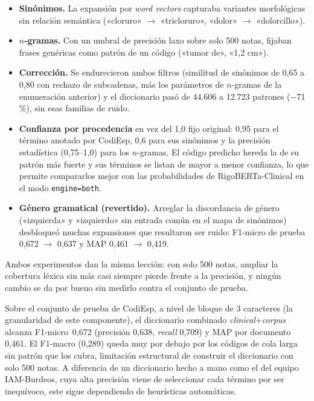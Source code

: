 \begin{itemize}
 \item \textbf{Sinónimos.} La expansión por \emph{word vectors} capturaba variantes morfológicas sin relación semántica («cloruro» $\to$ «tricloruro», «dolor» $\to$ «dolorcillo»).
 \item \textbf{$n$-gramas.} Con un umbral de precisión laxo sobre solo 500 notas, fijaban frases genéricas como patrón de un código («tumor de», «1,2 cm»).
 \item \textbf{Corrección.} Se endurecieron ambos filtros (similitud de sinónimos de 0,65 a 0,80 con rechazo de subcadenas, más los parámetros de $n$-gramas de la enumeración anterior) y el diccionario pasó de 44.606 a 12.723 patrones ($-$71\,\%), sin esas familias de ruido.
 \item \textbf{Confianza por procedencia} en vez del 1,0 fijo original: 0,95 para el término anotado por CodiEsp, 0,6 para sus sinónimos y la precisión estadística (0,75--1,0) para los $n$-gramas. El código predicho hereda la de su patrón más fuerte y sus términos se listan de mayor a menor confianza, lo que permite compararlos mejor con las probabilidades de RigoBERTa-Clinical en el modo \mbox{\texttt{engine=\textquotedbl{}both\textquotedbl{}}}.
 \item \textbf{Género gramatical (revertido).} Arreglar la discordancia de género («izquierda» y «izquierdo» sin entrada común en el mapa de sinónimos) desbloqueó muchas expansiones que resultaron ser ruido: F1-micro de prueba 0,672 $\to$ 0,637 y MAP 0,461 $\to$ 0,419.
\end{itemize}

Ambos experimentos dan la misma lección: con solo 500 notas, ampliar la cobertura léxica sin más casi siempre pierde frente a la precisión, y ningún cambio se da por bueno sin medirlo contra el conjunto de prueba.

Sobre el conjunto de prueba de CodiEsp, a nivel de bloque de 3 caracteres (la granularidad de este componente), el diccionario combinado \emph{clinical}+\emph{corpus} alcanza F1-micro~0,672 (precisión 0,638, \emph{recall} 0,709) y MAP por documento 0,461. El F1-macro (0,289) queda muy por debajo por los códigos de cola larga sin patrón que los cubra, limitación estructural de construir el diccionario con solo 500 notas. A diferencia de un diccionario hecho a mano como el del equipo IAM-Burdeos, cuya alta precisión viene de seleccionar cada término por ser inequívoco, este sigue dependiendo de heurísticas automáticas.

